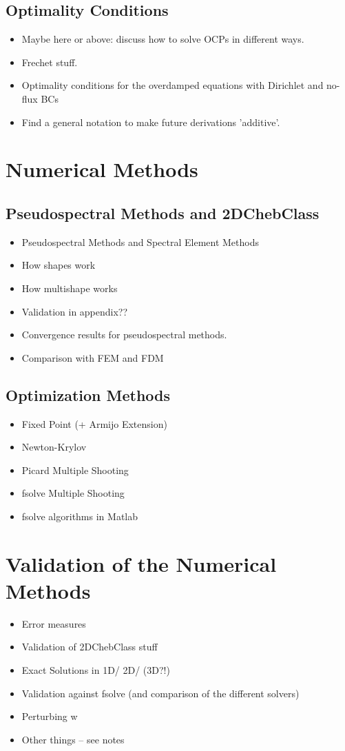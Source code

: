 \documentclass[11pt, a4paper]{article}
\theoremstyle{definition}
\begin{document}
	\subsection{Optimality Conditions}
		\begin{itemize}
			\item Maybe here or above: discuss how to solve OCPs in different ways.
			\item Frechet stuff.
			\item Optimality conditions for the overdamped equations with Dirichlet and no-flux BCs
			\item Find a general notation to make future derivations 'additive'.
		\end{itemize}

	\section{Numerical Methods}
	\subsection{Pseudospectral Methods and 2DChebClass}
		\begin{itemize}
			\item Pseudospectral Methods and Spectral Element Methods
			\item How shapes work
			\item How multishape works
			\item Validation in appendix??
			\item Convergence results for pseudospectral methods.
			\item Comparison with FEM and FDM
		\end{itemize}
	\subsection{Optimization Methods}
		\begin{itemize}
			\item Fixed Point (+ Armijo Extension)
			\item Newton-Krylov
			\item Picard Multiple Shooting
			\item fsolve Multiple Shooting 
			\item fsolve algorithms in Matlab
		\end{itemize}
	
	\section{Validation of the Numerical Methods}
	\begin{itemize}
		\item Error measures
		\item Validation of 2DChebClass stuff
		\item Exact Solutions in 1D/ 2D/ (3D?!)
		\item Validation against fsolve (and comparison of the different solvers)
		\item Perturbing w
		\item Other things -- see notes
	\end{itemize}
\end{document}
